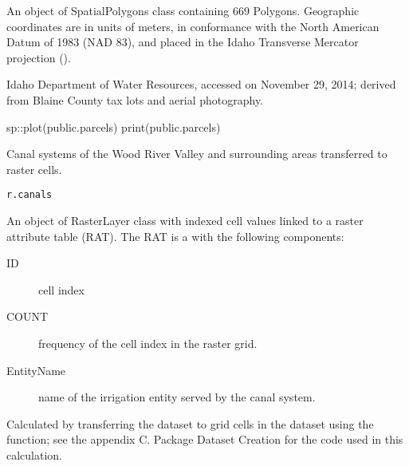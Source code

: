 \documentclass[a4paper]{book}
\begin{document}
%
\begin{Format}
An object of SpatialPolygons class containing 669 Polygons.
Geographic coordinates are in units of meters, in conformance with the
North American Datum of 1983 (NAD 83), and placed in the
Idaho Transverse Mercator projection ().
\end{Format}
%
\begin{Source}\relax
Idaho Department of Water Resources, accessed on November 29, 2014;
derived from Blaine County tax lots and aerial photography.
\end{Source}
%
\begin{Examples}
\begin{ExampleCode}
sp::plot(public.parcels)
print(public.parcels)

\end{ExampleCode}
\end{Examples}
%
\begin{Description}\relax
Canal systems of the Wood River Valley and surrounding areas transferred to raster cells.
\end{Description}
%
\begin{Usage}
\begin{verbatim}
r.canals
\end{verbatim}
\end{Usage}
%
\begin{Format}
An object of RasterLayer class with indexed cell values linked to
a raster attribute table (RAT).
The RAT is a  with the following components:
\begin{description}

\item[ID] cell index
\item[COUNT] frequency of the cell index in the raster grid.
\item[EntityName] name of the irrigation entity served by the canal system.

\end{description}

\end{Format}
%
\begin{Source}\relax
Calculated by transferring the  dataset to grid cells in the
 dataset using the  function;
see the appendix C. Package Dataset Creation for the \R{} code used in this calculation.
\end{Source}
\end{document}
